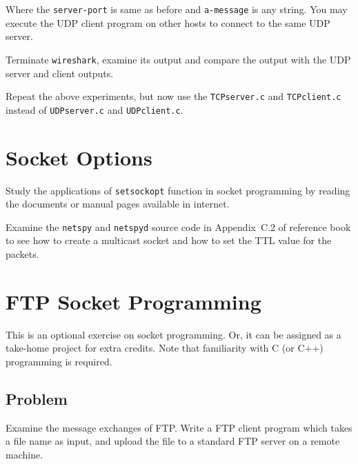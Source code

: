 \documentclass{UTNetLab}
\begin{document}
    Where the \lstinline{server-port} is same as before and \lstinline{a-message} is any string. You may execute the UDP client program on other hosts to connect to the same UDP server.

    Terminate \lstinline{wireshark}, examine its output and compare the output with the UDP server and client outputs.

    Repeat the above experiments, but now use the \lstinline{TCPserver.c} and \lstinline{TCPclient.c} instead of \lstinline{UDPserver.c} and \lstinline{UDPclient.c}.

\section{Socket Options}
    
    Study the applications of \lstinline{setsockopt} function in socket programming by reading the documents or manual pages available in internet.


    Examine the \lstinline{netspy} and \lstinline{netspyd} source code in Appendix~C.2 of reference book to see how to create a multicast socket and how to set the TTL value for the packets.
    

\section{FTP Socket Programming}
    This is an optional exercise on socket programming. Or, it can be assigned as a take-home project for extra credits. Note that familiarity with C (or C++) programming is required.

    \subsection*{Problem}
    Examine the message exchanges of FTP. Write a FTP client program which takes a file name as input, and upload the file to a standard FTP server on a remote machine.
\end{document}
